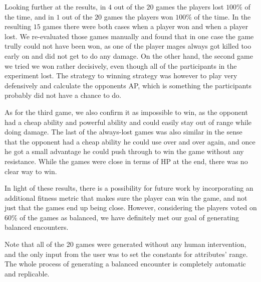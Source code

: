 Looking further at the results, in $4$ out of the $20$ games the players lost $100\%$ of the time,
and in $1$ out of the $20$ games the players won $100\%$ of the time. In the resulting $15$ games
there were both cases when a player won and when a player lost. We re-evaluated those games manually 
and found that in one case the game trully could not have been won, as one of the player mages always
got killed too early on and did not get to do any damage. On the other hand, the second game we tried
we won rather decisively, even though all of the participants in the experiment lost. The strategy to winning
strategy was however to play very defensively and calculate the opponents AP,
which is something the participants probably did not have a chance to do.

As for the third game, we also confirm it as impossible to win, as the opponent had a cheap ability and powerful ability
and could easily stay out of range while doing damage. The last of the always-lost games was also similar
in the sense that the opponent had a cheap ability he could use over and over again, and once he got a small
advantage he could push through to win the game without any resistance. While the games were close in terms
of HP at the end, there was no clear way to win.

In light of these results, there is a possibility for future work by incorporating an additional fitness
metric that makes sure the player can win the game, and not just that the games end up being close. However,
considering the players voted on $60\%$ of the games as balanced, we have definitely met our goal of
generating balanced encounters.

Note that all of the 20 games were generated without any human intervention, and the only input from the user
was to set the constants for attributes' range. The whole process of generating a balanced encounter is completely
automatic and replicable.
